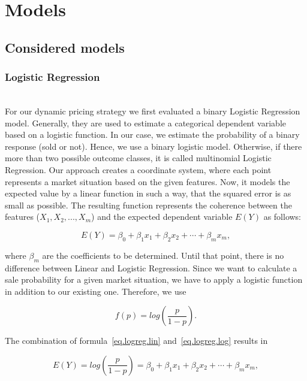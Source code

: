 \section{Models}
\label{sec:models}
\subsection{Considered models}
\subsubsection{Logistic Regression}
    ~\\
    For our dynamic pricing strategy we first evaluated a binary Logistic Regression model. Generally, they are used to estimate a categorical dependent variable based on a logistic function. In our case, we estimate the probability of a binary response (sold or not). Hence, we use a binary logistic model. Otherwise, if there more than two possible outcome classes, it is called multinomial Logistic Regression.
    Our approach creates a coordinate system, where each point represents a market situation based on the given features. Now, it models the expected value by a linear function in such a way, that the squared error is as small as possible. The resulting function represents the coherence between the features ($X_1, X_2, ..., X_m$) and the expected dependent variable $E(Y)$ as follows:

    \begin{equation}
    \label{eq.logreg.lin}
    E(Y) = \beta _{0}+\beta _{1}x_{1}+\beta _{2}x_{2}+\cdots +\beta _{m}x_{m},
    \end{equation}

    where $\beta _m$ are the coefficients to be determined. Until that point, there is no difference between Linear and Logistic Regression. Since we want to calculate a sale probability for a given market situation, we have to apply a logistic function in addition to our existing one. Therefore, we use

    \begin{equation}
    \label{eq.logreg.log}
    f(p)=log\left(\frac{p}{1-p}\right).
    \end{equation}

    The combination of formula~\ref{eq.logreg.lin} and~\ref{eq.logreg.log} results in

    \begin{equation}
    \label{eq.logreg.loglin}
    E(Y) = log\left(\frac{p}{1-p}\right) = \beta _{0}+\beta _{1}x_{1}+\beta _{2}x_{2}+\cdots +\beta _{m}x_{m},
    \end{equation}

